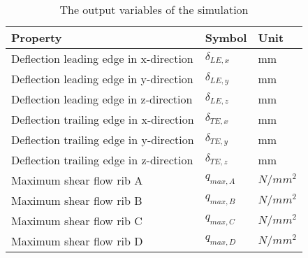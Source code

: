 \begin{table}[H]
\captionsetup{justification=centering}
\caption{The output variables of the simulation}
\label{tab:outputvar}
\begin{tabular}{|l|l|l|}
\hline
\textbf{Property}                                & \textbf{Symbol} & \textbf{Unit} \\  \hline
Deflection leading edge in x-direction  & $\delta_{LE,x}$  & mm    \\ \hline
Deflection leading edge in y-direction  & $\delta_{LE,y}$  & mm   \\ \hline
Deflection leading edge in z-direction  & $\delta_{LE,z}$  & mm   \\ \hline
Deflection trailing edge in x-direction & $\delta_{TE,x}$  & mm   \\ \hline
Deflection trailing edge in y-direction &  $\delta_{TE,y}$      & mm   \\ \hline
Deflection trailing edge in z-direction & $\delta_{TE,z}$  & mm   \\ \hline
Maximum shear flow rib A                &     $q_{max,A}$   & $N/mm^2$ \\ \hline
Maximum shear flow rib B                &  $q_{max,B}$       & $N/mm^2$ \\ \hline
Maximum shear flow rib C                &  $q_{max,C}$       & $N/mm^2$ \\ \hline
Maximum shear flow rib D                &  $q_{max,D}$      & $N/mm^2$ \\ \hline
\end{tabular}
\end{table}